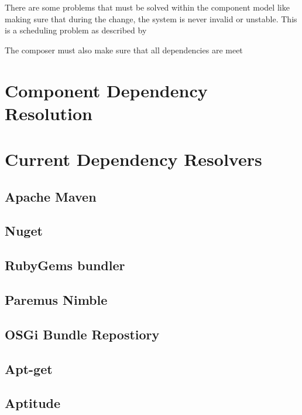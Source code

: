 There are some problems that must be solved within the component model like making sure that during the change,
the system is never invalid or unstable. 
This is a scheduling problem as described by %

The composer must also make sure that all dependencies are meet

\section{Component Dependency Resolution}


\section{Current Dependency Resolvers}

\subsection{Apache Maven}

\subsection{Nuget} 

\subsection{RubyGems bundler}


\subsection{Paremus Nimble}

\subsection{OSGi Bundle Repostiory}

\subsection{Apt-get}

\subsection{Aptitude}

